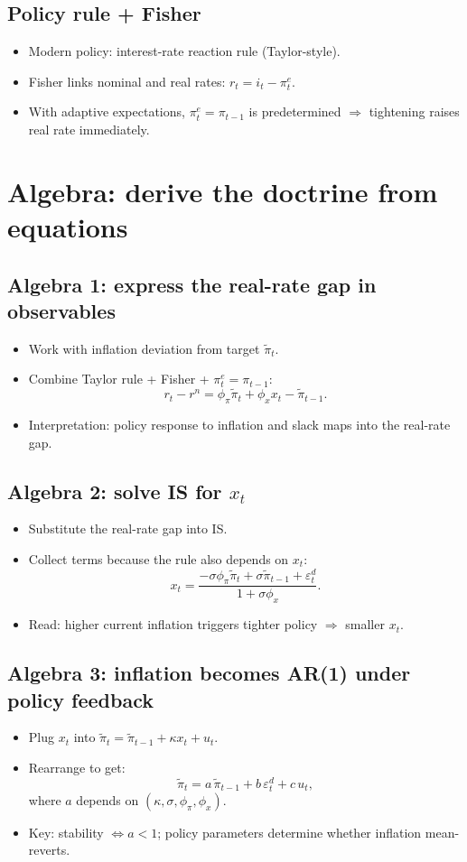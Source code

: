 \documentclass[11pt]{article}
\begin{document}
\subsection*{Policy rule + Fisher}
\begin{itemize}
\item Modern policy: interest-rate reaction rule (Taylor-style).
\item Fisher links nominal and real rates: $r_t=i_t-\pi_t^e$.
\item With adaptive expectations, $\pi_t^e=\pi_{t-1}$ is predetermined $\Rightarrow$ tightening raises real rate immediately.
\end{itemize}

\section{Algebra: derive the doctrine from equations}

\subsection*{Algebra 1: express the real-rate gap in observables}
\begin{itemize}
\item Work with inflation deviation from target $\tilde\pi_t$.
\item Combine Taylor rule + Fisher + $\pi_t^e=\pi_{t-1}$:
\[
r_t-r^n=\phi_\pi\tilde\pi_t+\phi_x x_t-\tilde\pi_{t-1}.
\]
\item Interpretation: policy response to inflation and slack maps into the real-rate gap.
\end{itemize}

\subsection*{Algebra 2: solve IS for $x_t$}
\begin{itemize}
\item Substitute the real-rate gap into IS.
\item Collect terms because the rule also depends on $x_t$:
\[
x_t=\frac{-\sigma\phi_{\pi}\tilde\pi_t+\sigma\tilde\pi_{t-1}+\varepsilon_t^{d}}{1+\sigma\phi_x}.
\]
\item Read: higher current inflation triggers tighter policy $\Rightarrow$ smaller $x_t$.
\end{itemize}

\subsection*{Algebra 3: inflation becomes AR(1) under policy feedback}
\begin{itemize}
\item Plug $x_t$ into $\tilde\pi_t=\tilde\pi_{t-1}+\kappa x_t+u_t$.
\item Rearrange to get:
\[
\tilde\pi_t
=
a\,\tilde\pi_{t-1}
+b\,\varepsilon_t^{d}
+c\,u_t,
\]
where $a$ depends on $(\kappa,\sigma,\phi_\pi,\phi_x)$.
\item Key: stability $\Leftrightarrow a<1$; policy parameters determine whether inflation mean-reverts.
\end{itemize}
\end{document}
